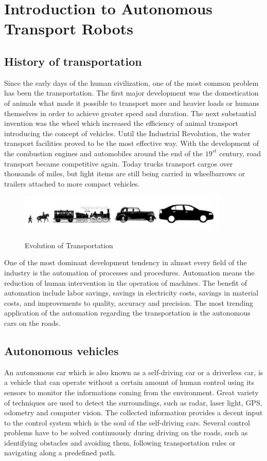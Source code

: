 \documentclass[12pt,english]{article}
\begin{document}
\section{Introduction to Autonomous Transport Robots}
\subsection{History of transportation}

Since the early days of the human civilization, one of the most common problem has been the transportation. The first major development was the domestication of animals what made it possible to transport more and heavier loads or humans themselves in order to achieve greater speed and duration. The next substantial invention was the wheel which increased the efficiency of animal transport introducing the concept of vehicles. Until the Industrial Revolution, the water transport facilities proved to be the most effective way. With the development of the combustion engines and automobiles around the end of the $19^{st}$ century, road transport became competitive again. Today trucks transport cargos over thousands of miles, but light items are still being carried in wheelbarrows or trailers attached to more compact vehicles. 

\begin{figure}[h]
	\centering
	\includegraphics[width=10cm]{figures/evot}
	\label{fig1}
	\caption{Evolution of Transportation}
\end{figure}

\noindent One of the most dominant development tendency in almost every field of the industry is the automation of processes and procedures. Automation means the reduction of human intervention in the operation of machines. The benefit of automation include labor savings, savings in electricity costs, savings in material costs, and improvements to quality, accuracy and precision. The most trending application of the automation regarding the transportation is the autonomous cars on the roads. 
\subsection{Autonomous vehicles}
An autonomous car which is also known as a self-driving car or a driverless car, is a vehicle that can operate without a certain amount of human control using its sensors to monitor the informations coming from the environment. Great variety of techniques are used to detect the surroundings, such as radar, laser light, GPS, odometry and computer vision. The collected information provides a decent input to the control system which is the soul of the self-driving cars. Several control problems have to be solved continuously during driving on the roads, such as identifying obstacles and avoiding them, following transportation rules or navigating along a predefined path.
\end{document}
